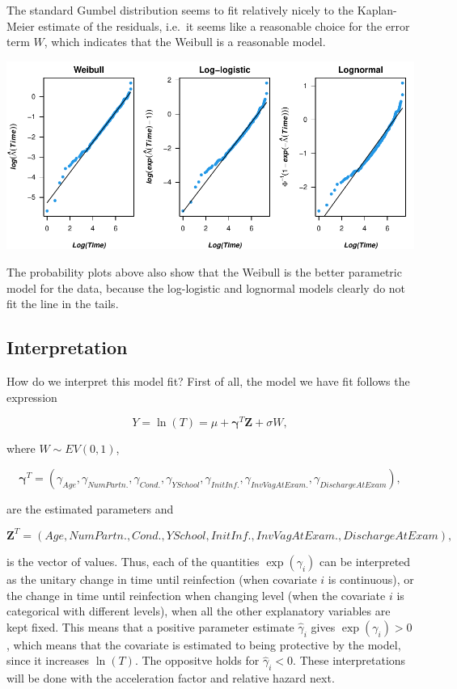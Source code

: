 \documentclass[
]{article}
\begin{document}
The standard Gumbel distribution seems to fit relatively nicely to the Kaplan-Meier estimate of the residuals, i.e.~it seems like a reasonable choice for the error term \(W\), which indicates that the Weibull is a reasonable model.

\includegraphics{practical_files/figure-latex/cumhaz-plot-1.pdf}

The probability plots above also show that the Weibull is the better parametric model for the data, because the log-logistic and lognormal models clearly do not fit the line in the tails.

\hypertarget{interpretation}{%
\subsection{Interpretation}\label{interpretation}}

How do we interpret this model fit? First of all, the model we have fit follows the expression

\[
Y = \ln(T) = \mu + \mathbf{\gamma}^T\mathbf{Z} + \sigma W,  
\]

where \(W \sim EV(0,1)\),

\[
\mathbf{\gamma}^T = (\gamma_{Age}, \gamma_{NumPartn.}, \gamma_{Cond.}, \gamma_{YSchool}, \gamma_{InitInf.}, \gamma_{InvVagAtExam.}, \gamma_{DischargeAtExam}),
\]

are the estimated parameters and

\[
\mathbf{Z}^T = (Age, NumPartn., Cond., YSchool, InitInf., InvVagAtExam., DischargeAtExam), 
\]

is the vector of values. Thus, each of the quantities \(\exp(\gamma_i)\) can be interpreted as the unitary change in time until reinfection (when covariate \(i\) is continuous), or the change in time until reinfection when changing level (when the covariate \(i\) is categorical with different levels), when all the other explanatory variables are kept fixed. This means that a positive parameter estimate \(\hat{\gamma}_i\) gives \(\exp(\gamma_i) > 0\), which means that the covariate is estimated to being protective by the model, since it increases \(\ln(T)\). The oppositve holds for \(\hat{\gamma}_i < 0\). These interpretations will be done with the acceleration factor and relative hazard next.
\end{document}
